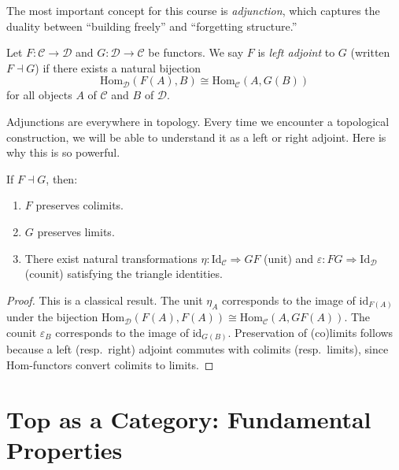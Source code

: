 The most important concept for this course is \emph{adjunction}, which
captures the duality between ``building freely'' and ``forgetting
structure.''

\begin{definition}[Adjunction]
Let $F\colon \mathcal{C} \to \mathcal{D}$ and $G\colon \mathcal{D} \to \mathcal{C}$ be
functors. We say $F$ is \emph{left adjoint} to $G$ (written $F \dashv G$) if there
exists a natural bijection
\[
  \mathrm{Hom}_{\mathcal{D}}(F(A), B) \cong \mathrm{Hom}_{\mathcal{C}}(A, G(B))
\]
for all objects $A$ of $\mathcal{C}$ and $B$ of $\mathcal{D}$.
\end{definition}

Adjunctions are everywhere in topology. Every time we encounter a
topological construction, we will be able to understand it as a left or
right adjoint. Here is why this is so powerful.

\begin{theorem}
If $F \dashv G$, then:
\begin{enumerate}
  \item $F$ preserves colimits.
  \item $G$ preserves limits.
  \item There exist natural transformations $\eta\colon \mathrm{Id}_\mathcal{C}
    \Rightarrow GF$ (unit) and $\varepsilon\colon FG \Rightarrow \mathrm{Id}_\mathcal{D}$
    (counit) satisfying the triangle identities.
\end{enumerate}
\end{theorem}

\begin{proof}
This is a classical result. The unit $\eta_A$ corresponds to the image of
$\mathrm{id}_{F(A)}$ under the bijection
$\mathrm{Hom}_\mathcal{D}(F(A),F(A)) \cong \mathrm{Hom}_\mathcal{C}(A,GF(A))$.
The counit $\varepsilon_B$ corresponds to the image of $\mathrm{id}_{G(B)}$. Preservation
of (co)limits follows because a left (resp.\ right) adjoint commutes with colimits
(resp.\ limits), since Hom-functors convert colimits to limits.
\end{proof}

\section{$\mathbf{Top}$ as a Category: Fundamental Properties}

